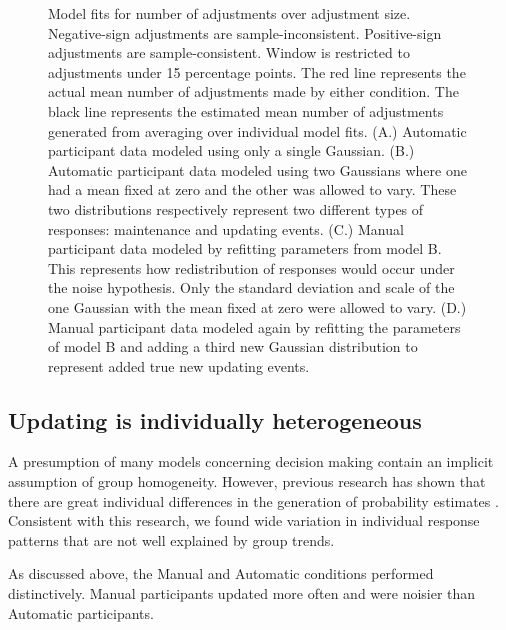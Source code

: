 \documentclass[sn-apa]{sn-jnl}\usepackage[]{graphicx}\usepackage[]{xcolor}
\begin{document}
\begin{figure}[htp]
\caption{Model fits for number of adjustments over adjustment size. Negative-sign adjustments are sample-inconsistent. Positive-sign adjustments are sample-consistent. Window is restricted to adjustments under 15 percentage points. The red line represents the actual mean number of adjustments made by either condition.  The black line represents the estimated mean number of adjustments generated from averaging over individual model fits. (A.) Automatic participant data modeled using only a single Gaussian. (B.) Automatic participant data modeled using two Gaussians where one had a mean fixed at zero and the other was allowed to vary. These two distributions respectively represent two different types of responses: maintenance and updating events. (C.) Manual participant data modeled by refitting  parameters from model B. This represents how redistribution of responses would occur under the noise hypothesis. Only the standard deviation and scale of the one Gaussian with the mean fixed at zero were allowed to vary. (D.) Manual participant data modeled again by refitting the parameters of model B and adding a third new Gaussian distribution to represent added true new updating events.}

\label{fig:numadj}
\end{figure}


\subsection{Updating is individually heterogeneous}

A presumption of many models concerning decision making contain an implicit assumption of group homogeneity. However, previous research has shown that there are great individual differences in the generation of probability estimates \cite{khaw2021}. Consistent with this research, we found wide variation in individual response patterns that are not well explained by group trends.





As discussed above, the Manual and Automatic conditions performed distinctively. Manual participants updated more often and were noisier than Automatic participants. 
\end{document}
